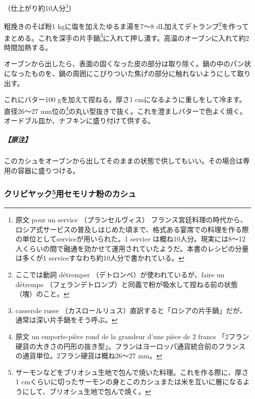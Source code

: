\begin{recette}
（仕上がり約10人分\footnote{原文 pour un service （プランセルヴィス）
  フランス宮廷料理の時代から、ロシア式サービスの普及しはじめた頃まで、格式ある宴席での料理を作る際の単位としてserviceが用いられた。1
  service
  は概ね10人分。現実には8〜12人くらいの間で融通を効かせて運用されていたようだ。本書のレシピの分量は多くが1
  serviceすなわち約10人分で書かれている。}）

粗挽きのそば粉1 kgに塩を加えたゆるま湯を7〜8
dL加えてデトランプ\footnote{ここでは動詞 détremper
  （デトロンペ）が使われているが、faire un détrempe
  （フェランデトロンプ）と同義で粉が吸水して捏ねる前の状態（塊）のこと。}を作ってまとめる。これを深手の片手鍋\footnote{casserole
  russe
  （カスロールリュス）直訳すると「ロシアの片手鍋」だが、通常は深い片手鍋をそう呼ぶ。}に入れて押し潰す。高温のオーブンに入れて約2時間加熱する。

オーブンから出したら、表面の固くなった皮の部分は取り除く。鍋の中のパン状になったものを、鍋の周囲にこびりついた焦げの部分に触れないようにして取り出す。

これにバター100 gを加えて捏ねる。厚さ1
cmになるように重しをして冷ます。直径26〜27 mm位の\footnote{原文 un
  emporte-pièce rond de la grandeur d'une pièce de 2 francs
  「2フラン硬貨の大きさの円形の抜き型」。フランはヨーロッパ通貨統合前のフランスの通貨単位。2フラン硬貨は概ね26〜27
  mm。}の丸い型抜きで抜く。これを澄ましバターで色よく焼く。オードブル皿か、ナフキンに盛り付けて供する。

\hypertarget{ux539fux6ce8}{%
\subparagraph{【原注】}\label{ux539fux6ce8}}

このカシュをオーブンから出してそのままの状態で供してもいい。その場合は専用の容器に盛りつける。

\hypertarget{kache-de-semoule-pour-coulibiac}{%
\subsubsection[クリビヤック用セモリナ粉のカシュ]{\texorpdfstring{クリビヤック\footnote{サーモンなどをブリオシュ生地で包んで焼いた料理。これを作る際に、厚さ1
  cmくらいに切ったサーモンの身とこのカシュまたは米を互いに層になるようにして、ブリオシュ生地で包んで焼く。}用セモリナ粉のカシュ}{クリビヤック用セモリナ粉のカシュ}}\label{kache-de-semoule-pour-coulibiac}}




\end{recette}
